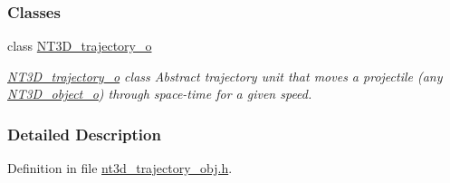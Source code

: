 \subsubsection*{Classes}
\begin{DoxyCompactItemize}
\item 
class \hyperlink{class_n_t3_d__trajectory__o}{NT3D\_\-trajectory\_\-o}
\begin{DoxyCompactList}\small\item\em \hyperlink{class_n_t3_d__trajectory__o}{NT3D\_\-trajectory\_\-o} class Abstract trajectory unit that moves a projectile (any \hyperlink{class_n_t3_d__object__o}{NT3D\_\-object\_\-o}) through space-\/time for a given speed. \item\end{DoxyCompactList}\end{DoxyCompactItemize}


\subsubsection{Detailed Description}


Definition in file \hyperlink{nt3d__trajectory__obj_8h_source}{nt3d\_\-trajectory\_\-obj.h}.

